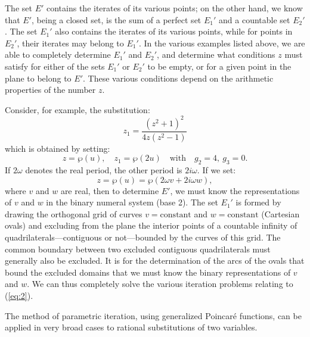 \documentclass[12pt, a4paper]{article}
\begin{document}
The set $E'$ contains the iterates of its various points; on the other hand, we
know that $E'$, being a closed set, is the sum of a perfect set $E_1'$ and a
countable set $E_2'$. The set $E_1'$ also contains the iterates of its various
points, while for points in $E_2'$, their iterates may belong to $E_1'$. In the
various examples listed above, we are able to completely determine $E_1'$ and
$E_2'$, and determine what conditions $z$ must satisfy for either of the sets
$E_1'$ or $E_2'$ to be empty, or for a given point in the plane to belong to
$E'$. These various conditions depend on the arithmetic properties of the number
$z$.

\vspace{1em}
{
\small
Consider, for example, the substitution:
\begin{equation}
    \label{eq:2}
    z_1 = \frac{(z^2+1)^2}{4z(z^2-1)}
\end{equation}
which is obtained by setting:
\[
    z = \wp(u), \quad z_1 = \wp(2u) \quad \text{with} \quad g_2 = 4, \ g_3 = 0.
\]
If $2\omega$ denotes the real period, the other period is $2i\omega$. If we set:
\[
    z = \wp(u) = \wp(2\omega v + 2i\omega w),
\]
where $v$ and $w$ are real, then to determine $E'$, we must know the
representations of $v$ and $w$ in the binary numeral system (base 2). The set
$E_1'$ is formed by drawing the orthogonal grid of curves $v = \text{constant}$
and $w = \text{constant}$ (Cartesian ovals) and excluding from the plane the
interior points of a countable infinity of quadrilaterals---contiguous or
not---bounded by the curves of this grid. The common boundary between two
excluded contiguous quadrilaterals must generally also be excluded. It is for
the determination of the arcs of the ovals that bound the excluded domains that
we must know the binary representations of $v$ and $w$. We can thus completely
solve the various iteration problems relating to (\ref{eq:2}).
}
\vspace{1em}

The method of parametric iteration, using generalized Poincaré functions, can be
applied in very broad cases to rational substitutions of two variables.
\end{document}

